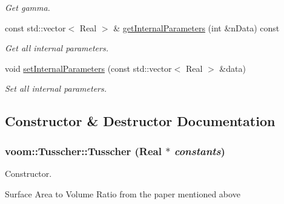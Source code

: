 \begin{DoxyCompactItemize}
\begin{DoxyCompactList}\small\item\em Get gamma. \item\end{DoxyCompactList}\item 
\hypertarget{classvoom_1_1_tusscher_a8647071908682752631078f2f65eacc3}{
const std::vector$<$ Real $>$ \& \hyperlink{classvoom_1_1_tusscher_a8647071908682752631078f2f65eacc3}{getInternalParameters} (int \&nData) const }
\label{classvoom_1_1_tusscher_a8647071908682752631078f2f65eacc3}

\begin{DoxyCompactList}\small\item\em Get all internal parameters. \item\end{DoxyCompactList}\item 
\hypertarget{classvoom_1_1_tusscher_a399257b5f36ded2ad9c66529df630f00}{
void \hyperlink{classvoom_1_1_tusscher_a399257b5f36ded2ad9c66529df630f00}{setInternalParameters} (const std::vector$<$ Real $>$ \&data)}
\label{classvoom_1_1_tusscher_a399257b5f36ded2ad9c66529df630f00}

\begin{DoxyCompactList}\small\item\em Set all internal parameters. \item\end{DoxyCompactList}\end{DoxyCompactItemize}


\subsection{Constructor \& Destructor Documentation}
\hypertarget{classvoom_1_1_tusscher_a8ee053f384729caad43bea1f9b2fcd94}{
\subsubsection[{Tusscher}]{\setlength{\rightskip}{0pt plus 5cm}voom::Tusscher::Tusscher (Real $\ast$ {\em constants})}}
\label{classvoom_1_1_tusscher_a8ee053f384729caad43bea1f9b2fcd94}


Constructor. 

Surface Area to Volume Ratio from the paper mentioned above 

